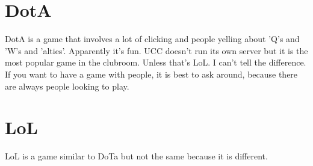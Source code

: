 \section{DotA}
DotA is a game that involves a lot of clicking and people yelling about 'Q's and 'W's and 'alties'. Apparently it's fun. UCC doesn't run its own server but it is the most popular game in the clubroom. Unless that's LoL. I can't tell the difference. If you want to have a game with people, it is best to ask around, because there are always people looking to play.

\section{LoL}
LoL is a game similar to DoTa but not the same because it is different.
